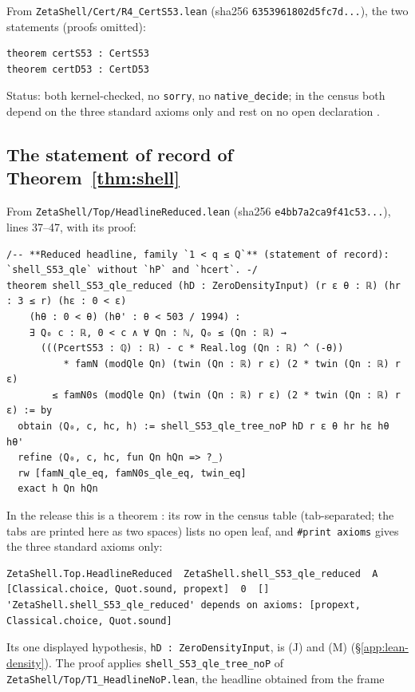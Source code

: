 From \texttt{ZetaShell/Cert/R4\_CertS53.lean} (sha256 \texttt{6353961802d5fc7d...}), the two statements (proofs omitted):
\begin{Verbatim}[fontsize=\footnotesize,breaklines,frame=single,framesep=2mm]
theorem certS53 : CertS53
theorem certD53 : CertD53
\end{Verbatim}
Status: both kernel-checked, no \texttt{sorry}, no \texttt{native\_decide}; in the census both depend on the three standard axioms only and rest
on no open declaration \tagL.

\subsection{The statement of record of Theorem~\ref{thm:shell}}\label{app:lean-record}
From \texttt{ZetaShell/Top/HeadlineReduced.lean} (sha256 \texttt{e4bb7a2ca9f41c53...}), lines 37--47, with its proof:
\begin{Verbatim}[fontsize=\footnotesize,breaklines,frame=single,framesep=2mm]
/-- **Reduced headline, family `1 < q ≤ Q`** (statement of record): `shell_S53_qle` without `hP` and `hcert`. -/
theorem shell_S53_qle_reduced (hD : ZeroDensityInput) (r ε θ : ℝ) (hr : 3 ≤ r) (hε : 0 < ε)
    (hθ : 0 < θ) (hθ' : θ < 503 / 1994) :
    ∃ Q₀ c : ℝ, 0 < c ∧ ∀ Qn : ℕ, Q₀ ≤ (Qn : ℝ) →
      (((PcertS53 : ℚ) : ℝ) - c * Real.log (Qn : ℝ) ^ (-θ))
          * famN (modQle Qn) (twin (Qn : ℝ) r ε) (2 * twin (Qn : ℝ) r ε)
        ≤ famN0s (modQle Qn) (twin (Qn : ℝ) r ε) (2 * twin (Qn : ℝ) r ε) := by
  obtain ⟨Q₀, c, hc, h⟩ := shell_S53_qle_tree_noP hD r ε θ hr hε hθ hθ'
  refine ⟨Q₀, c, hc, fun Qn hQn => ?_⟩
  rw [famN_qle_eq, famN0s_qle_eq, twin_eq]
  exact h Qn hQn
\end{Verbatim}
In the release this is a theorem \tagL: its row in the census table (tab-separated; the tabs are printed here as two spaces) lists no open leaf,
and \texttt{\#print axioms} gives the three standard axioms only:
\begin{Verbatim}[fontsize=\footnotesize,breaklines,frame=single,framesep=2mm]
ZetaShell.Top.HeadlineReduced  ZetaShell.shell_S53_qle_reduced  A  [Classical.choice, Quot.sound, propext]  0  []
'ZetaShell.shell_S53_qle_reduced' depends on axioms: [propext, Classical.choice, Quot.sound]
\end{Verbatim}
Its one displayed hypothesis, \texttt{hD : ZeroDensityInput}, is (J) and (M) (\S\ref{app:lean-density}). The proof applies
\texttt{shell\_S53\_qle\_tree\_noP} of \texttt{ZetaShell/Top/T1\_HeadlineNoP.lean}, the headline obtained from the frame
